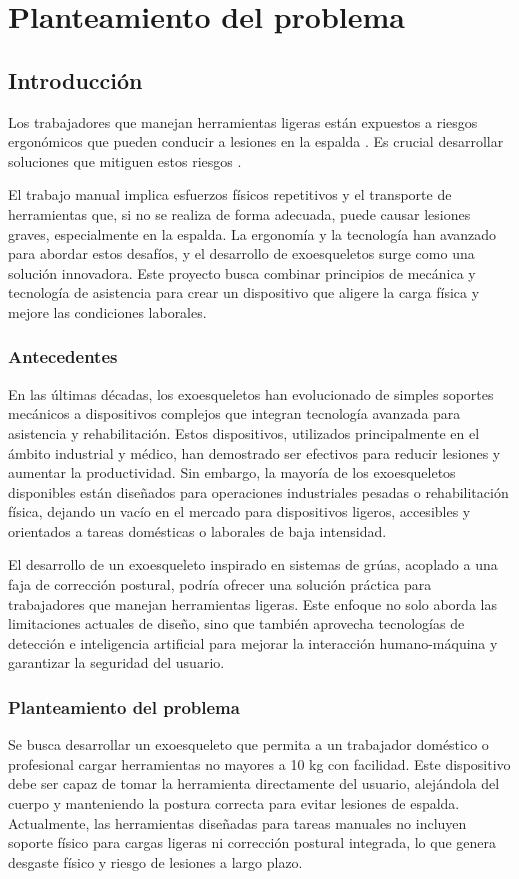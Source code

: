 \chapter{Planteamiento del problema}
\section{Introducción}
Los trabajadores que manejan herramientas ligeras están expuestos a riesgos ergonómicos que pueden conducir a lesiones en la espalda \cite{Williams2022}. Es crucial desarrollar soluciones que mitiguen estos riesgos \cite{Evans2028}.

El trabajo manual implica esfuerzos físicos repetitivos y el transporte de herramientas que, si no se realiza de forma adecuada, puede causar lesiones graves, especialmente en la espalda. La ergonomía y la tecnología han avanzado para abordar estos desafíos, y el desarrollo de exoesqueletos surge como una solución innovadora. Este proyecto busca combinar principios de mecánica y tecnología de asistencia para crear un dispositivo que aligere la carga física y mejore las condiciones laborales.

\subsection{Antecedentes} %
En las últimas décadas, los exoesqueletos han evolucionado de simples soportes mecánicos a dispositivos complejos que integran tecnología avanzada para asistencia y rehabilitación. Estos dispositivos, utilizados principalmente en el ámbito industrial y médico, han demostrado ser efectivos para reducir lesiones y aumentar la productividad. Sin embargo, la mayoría de los exoesqueletos disponibles están diseñados para operaciones industriales pesadas o rehabilitación física, dejando un vacío en el mercado para dispositivos ligeros, accesibles y orientados a tareas domésticas o laborales de baja intensidad.

El desarrollo de un exoesqueleto inspirado en sistemas de grúas, acoplado a una faja de corrección postural, podría ofrecer una solución práctica para trabajadores que manejan herramientas ligeras. Este enfoque no solo aborda las limitaciones actuales de diseño, sino que también aprovecha tecnologías de detección e inteligencia artificial para mejorar la interacción humano-máquina y garantizar la seguridad del usuario.


\subsection{Planteamiento del problema}
Se busca desarrollar un exoesqueleto que permita a un trabajador doméstico o profesional cargar herramientas no mayores a 10 kg con facilidad. Este dispositivo debe ser capaz de tomar la herramienta directamente del usuario, alejándola del cuerpo y manteniendo la postura correcta para evitar lesiones de espalda. Actualmente, las herramientas diseñadas para tareas manuales no incluyen soporte físico para cargas ligeras ni corrección postural integrada, lo que genera desgaste físico y riesgo de lesiones a largo plazo.

